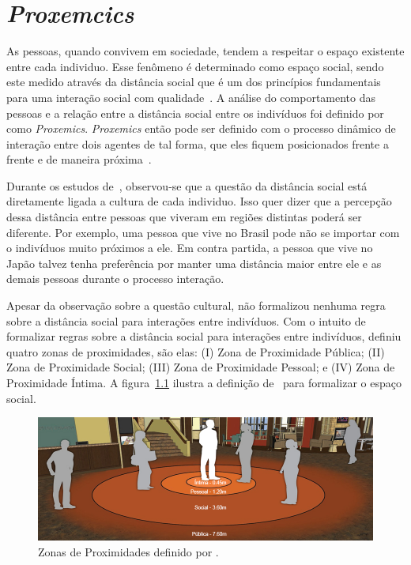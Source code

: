 \chapter{\emph{Proxemcics}}
\label{sec:proxemics}

As pessoas, quando convivem em sociedade, tendem a respeitar o espaço existente entre cada individuo. Esse fenômeno é determinado como espaço social, sendo este medido através da distância social que é um dos princípios fundamentais para uma interação social com qualidade~\cite{Hall:1969, Henkel:2014}. A análise do comportamento das pessoas e a relação entre a distância social entre os indivíduos foi definido por~ como \emph{Proxemics}. \emph{Proxemics} então pode ser definido com o processo dinâmico de interação entre dois agentes de tal forma, que eles fiquem posicionados frente a frente e de maneira próxima~\cite{Mead:2011b}.

Durante os estudos de~, observou-se que a questão da distância social está diretamente ligada a cultura de cada individuo. Isso quer dizer que a percepção dessa distância entre pessoas que viveram em regiões distintas poderá ser diferente. Por exemplo, uma pessoa que vive no Brasil pode não se importar com o indivíduos muito próximos a ele. Em contra partida, a pessoa que vive no Japão talvez tenha preferência por manter uma distância maior entre ele e as demais pessoas durante o processo interação.

Apesar da observação sobre a questão cultural,  não formalizou nenhuma regra sobre a distância social para interações entre indivíduos. Com o intuito de formalizar regras sobre a distância social para interações entre indivíduos,  definiu quatro zonas de proximidades, são elas: (I) Zona de Proximidade Pública; (II) Zona de Proximidade Social; (III) Zona de Proximidade Pessoal; e (IV) Zona de Proximidade Íntima. A figura~\ref{fig:proximityzones} ilustra a definição de~ para formalizar o espaço social.

\begin{figure}[ht!]
	\centering
	\includegraphics[width=\textwidth]{images/proxemicszones.png}
	\caption{Zonas de Proximidades definido por .}
	\label{fig:proximityzones}
\end{figure}

